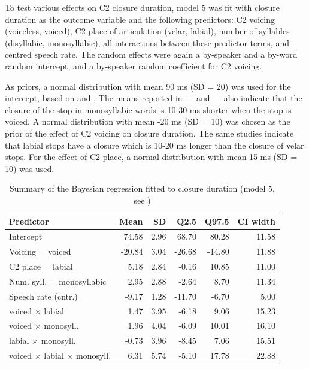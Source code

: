 \documentclass[12pt,a4paper,]{article}
\providecommand{\DIFaddtex}[1]{{\protect\color{blue}\uwave{#1}}} %
\providecommand{\DIFdeltex}[1]{{\protect\color{red}\sout{#1}}}                      %
\providecommand{\DIFaddbegin}{} %
\providecommand{\DIFaddend}{} %
\providecommand{\DIFdelbegin}{} %
\providecommand{\DIFdelend}{} %
\providecommand{\DIFadd}[1]{\texorpdfstring{\DIFaddtex{#1}}{#1}} %
\providecommand{\DIFdel}[1]{\texorpdfstring{\DIFdeltex{#1}}{}} %
\newcommand{\DIFscaledelfig}{0.5}
\newlength{\DIFdelgraphicswidth} %
\newlength{\DIFdelgraphicsheight} %
\newcommand{\DIFaddincludegraphics}[2][]{{\color{blue}\fbox{\DIFOincludegraphics[#1]{#2}}}} %
\newcommand{\DIFdelincludegraphics}[2][]{%
\sbox{\DIFdelgraphicsbox}{\DIFOincludegraphics[#1]{#2}}%
\settoboxwidth{\DIFdelgraphicswidth}{\DIFdelgraphicsbox} %
\settoboxtotalheight{\DIFdelgraphicsheight}{\DIFdelgraphicsbox} %
\scalebox{\DIFscaledelfig}{%
\parbox[b]{\DIFdelgraphicswidth}{\usebox{\DIFdelgraphicsbox}\\[-\baselineskip] \rule{\DIFdelgraphicswidth}{0em}}\llap{\resizebox{\DIFdelgraphicswidth}{\DIFdelgraphicsheight}{%
\setlength{\unitlength}{\DIFdelgraphicswidth}%
\begin{picture}(1,1)%
\thicklines\linethickness{2pt} %
{\color[rgb]{1,0,0}\put(0,0){\framebox(1,1){}}}%
{\color[rgb]{1,0,0}\put(0,0){\line( 1,1){1}}}%
{\color[rgb]{1,0,0}\put(0,1){\line(1,-1){1}}}%
\end{picture}%
}\hspace*{3pt}}} %
} %
\DeclareRobustCommand{\DIFaddbegin}{\DIFOaddbegin \let\includegraphics\DIFaddincludegraphics} %
\DeclareRobustCommand{\DIFaddend}{\DIFOaddend \let\includegraphics\DIFOincludegraphics} %
\DeclareRobustCommand{\DIFdelbegin}{\DIFOdelbegin \let\includegraphics\DIFdelincludegraphics} %
\DeclareRobustCommand{\DIFdelend}{\DIFOaddend \let\includegraphics\DIFOincludegraphics} %
\begin{document}
\label{s:clos}

To test various effects on C2 closure duration, model 5 was fit with
closure duration as the outcome variable and the following predictors:
C2 voicing (voiceless, voiced), C2 place of articulation (velar,
labial), number of syllables (disyllabic, monosyllabic), all
interactions between these predictor terms, and centred speech rate. The
random effects were again a by-speaker and a by-word random intercept,
and a by-speaker random coefficient for C2 voicing.

As priors, a normal distribution with mean 90 ms (SD = 20) was used for
the intercept, based on \citet{sharf1962} and \citet{luce1985}. The
means reported in \DIFdelbegin \DIFdel{\mbox{%
\citet{sharf1962} }\hspace{0pt}%
and \mbox{%
\citet{luce1985} }\hspace{0pt}%
}\DIFdelend \DIFaddbegin \DIFadd{these studies }\DIFaddend also indicate that the closure of the
stop in monosyllabic words is 10-30 ms shorter when the stop is voiced.
A normal distribution with mean -20 ms (SD = 10) was chosen as the prior
of the effect of C2 voicing on closure duration. The same studies
indicate that labial stops have a closure which is 10-20 ms longer than
the closure of velar stops. For the effect of C2 place, a normal
distribution with mean 15 ms (SD = 10) was used.

\begin{table}[t]

\caption{\label{tab:clos-5-table}Summary of the Bayesian regression fitted to closure duration (model 5, see )}
\centering
\fontsize{8}{10}\selectfont
\begin{tabular}{lrrrrr}
\toprule
Predictor & Mean & SD & Q2.5 & Q97.5 & CI width\\
\midrule
Intercept & 74.58 & 2.96 & 68.70 & 80.28 & 11.58\\
Voicing = voiced & -20.84 & 3.04 & -26.68 & -14.80 & 11.88\\
C2 place = labial & 5.18 & 2.84 & -0.16 & 10.85 & 11.00\\
Num. syll. = monosyllabic & 2.95 & 2.88 & -2.64 & 8.70 & 11.34\\
Speech rate (cntr.) & -9.17 & 1.28 & -11.70 & -6.70 & 5.00\\
voiced × labial & 1.47 & 3.95 & -6.18 & 9.06 & 15.23\\
voiced × monosyll. & 1.96 & 4.04 & -6.09 & 10.01 & 16.10\\
labial × monosyll. & -0.73 & 3.96 & -8.45 & 7.06 & 15.51\\
voiced × labial × monosyll. & 6.31 & 5.74 & -5.10 & 17.78 & 22.88\\
\bottomrule
\end{tabular}
\end{table}
\end{document}
